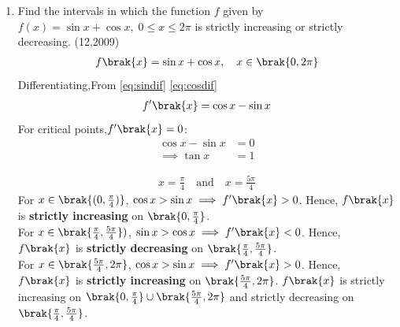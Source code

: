 \begin{enumerate}[label=\thesubsection.\arabic*, ref=\thesubsection.\theenumi]
    \begin{align}
    	\brak{\vec{x} - \vec{p}} \cdot \brak{\vec{x} + \vec{p}} = 80
    	&\implies
    	\brak{\vec{x} - \vec{p}}^{\top} \brak{\vec{x} + \vec{p}} = 80
    	\\
    	\vec{x}^{\top}\vec{x} + \vec{x}^{\top}\vec{p} - \vec{p}^{\top}\vec{x} - \vec{p}^{\top}\vec{p} &= 80
    \end{align}
    As vector dot product is commutative ($\vec{x}^{\top}\vec{p} = \vec{p}^{\top}\vec{x}$)
    \begin{align}
    	\norm{\vec{x}}^2 - \norm{\vec{p}}^2 &= 80
    	\\
    	\norm{\vec{x}}^2 - 1 &= 80
    	\\
    	\norm{\vec{x}}^2 &= 81
    	\\
    	\implies \norm{\vec{x}} &= 9
    \end{align}
    
  \item Find the intervals in which the function $f$ given by $f(x) = \sin x + \cos x, \; 0 \le x \le 2\pi$ is strictly increasing or strictly decreasing. \hfill{(12,2009)}  \\
  \solution
  \begin{align}
  	f\brak{x} = \sin x + \cos x, \quad x \in \brak{0, 2\pi}
  \end{align}
  Differentiating,From \eqref{eq:sindif} \eqref{eq:cosdif}
  \begin{align}
  	f'\brak{x} = \cos x - \sin x
  \end{align}
  For critical points,$f'\brak{x} = 0$:
  \begin{align}
  	\cos x - \sin x &= 0
  	\\
  	\implies \tan x &= 1
  \end{align}
  
  \begin{align}
  	x = \frac{\pi}{4} \quad \text{and} \quad x = \frac{5\pi}{4}
  \end{align}
  For $x \in \brak{(0, \frac{\pi}{4})}$, $\cos x > \sin x \implies f'\brak{x} > 0$.
  Hence, $f\brak{x}$ is \textbf{strictly increasing} on $\brak{0, \frac{\pi}{4}}$.\\
  For $x \in \brak{\frac{\pi}{4}, \frac{5\pi}{4}})$, $\sin x > \cos x \implies f'\brak{x} < 0$.
  Hence, $f\brak{x}$ is \textbf{strictly decreasing} on $\brak{\frac{\pi}{4}, \frac{5\pi}{4}}$.\\
  For $x \in \brak{\frac{5\pi}{4}, 2\pi}$, $\cos x > \sin x \implies f'\brak{x} > 0$.
  Hence, $f\brak{x}$ is \textbf{strictly increasing} on $\brak{\frac{5\pi}{4}, 2\pi}$.
  $f\brak{x}$ is strictly increasing on $\brak{0, \frac{\pi}{4}} \cup \brak{\frac{5\pi}{4}, 2\pi}$ and strictly decreasing on $\brak{\frac{\pi}{4}, \frac{5\pi}{4}}$.\\
  

\end{enumerate}
